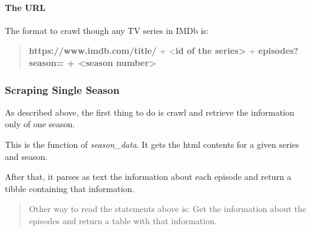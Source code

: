 \documentclass[
  letterpaper,
  DIV=11,
  numbers=noendperiod]{scrartcl}
\let\oldparagraph\paragraph
\renewcommand{\paragraph}[1]{\oldparagraph{#1}\mbox{}}
\begin{document}
\hypertarget{the-url}{%
\paragraph{The URL}\label{the-url}}

The format to crawl though any TV series in IMDb is:

\begin{quote}
\textbf{https://www.imdb.com/title/} + \textless{}\textbf{id of the
series\textgreater{}} + \textbf{episodes?season= + \textless season
number\textgreater{}}
\end{quote}

\hypertarget{scraping-single-season}{%
\subsubsection{Scraping Single Season}\label{scraping-single-season}}

As described above, the first thing to do is crawl and retrieve the
information only of one season.

This is the function of \emph{season\_data}. It gets the html contents
for a given series and season.

After that, it parses as text the information about each episode and
return a tibble containing that information.

\begin{quote}
Other way to read the statements above is: Get the information about the
episodes and return a table with that information.
\end{quote}
\end{document}
